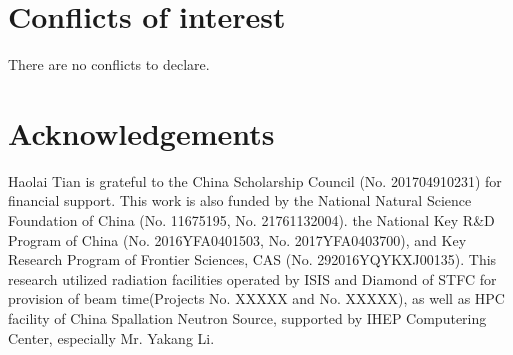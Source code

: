\documentclass[twoside,twocolumn,9pt]{article}
\begin{document}
%
%
%

\section*{Conflicts of interest}
There are no conflicts to declare.

\section*{Acknowledgements}
Haolai Tian is grateful to the China Scholarship Council (No. 201704910231) for financial support.
This work is also funded by the National Natural Science Foundation of China (No. 11675195, No. 21761132004).
the National Key R\&D Program of China (No. 2016YFA0401503, No. 2017YFA0403700), and Key Research Program of Frontier Sciences, CAS (No. 292016YQYKXJ00135).
This research utilized radiation facilities operated by ISIS and Diamond of STFC for provision of beam time(Projects No. XXXXX and No. XXXXX),
as well as HPC facility of China Spallation Neutron Source, supported by IHEP Computering Center, especially Mr. Yakang Li.



\balance


\end{document}
